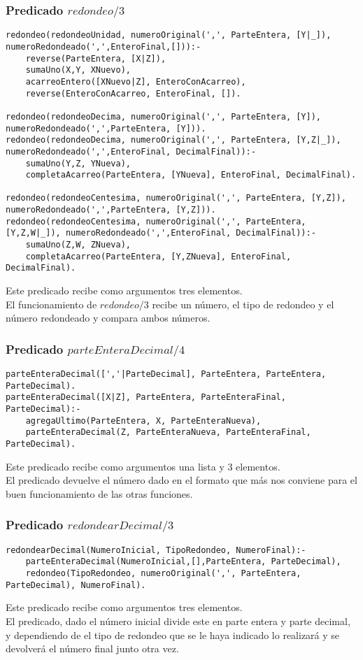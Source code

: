 \documentclass[11pt, a4paper]{article}
\begin{document}
\subsubsection{Predicado $redondeo/3$}
\begin{lstlisting}[frame=single]
redondeo(redondeoUnidad, numeroOriginal(',', ParteEntera, [Y|_]), numeroRedondeado(',',EnteroFinal,[])):-
    reverse(ParteEntera, [X|Z]),
    sumaUno(X,Y, XNuevo),
    acarreoEntero([XNuevo|Z], EnteroConAcarreo),
    reverse(EnteroConAcarreo, EnteroFinal, []).

redondeo(redondeoDecima, numeroOriginal(',', ParteEntera, [Y]), numeroRedondeado(',',ParteEntera, [Y])).
redondeo(redondeoDecima, numeroOriginal(',', ParteEntera, [Y,Z|_]), numeroRedondeado(',',EnteroFinal, DecimalFinal)):-
    sumaUno(Y,Z, YNueva),
    completaAcarreo(ParteEntera, [YNueva], EnteroFinal, DecimalFinal).

redondeo(redondeoCentesima, numeroOriginal(',', ParteEntera, [Y,Z]), numeroRedondeado(',',ParteEntera, [Y,Z])).
redondeo(redondeoCentesima, numeroOriginal(',', ParteEntera, [Y,Z,W|_]), numeroRedondeado(',',EnteroFinal, DecimalFinal)):-
    sumaUno(Z,W, ZNueva),
    completaAcarreo(ParteEntera, [Y,ZNueva], EnteroFinal, DecimalFinal).
\end{lstlisting}
Este predicado recibe como argumentos tres elementos.\\
El funcionamiento de $redondeo/3$ recibe un número, el tipo de redondeo y el número redondeado y compara ambos números.
\subsubsection{Predicado $parteEnteraDecimal/4$}
\begin{lstlisting}[frame=single]
parteEnteraDecimal([','|ParteDecimal], ParteEntera, ParteEntera, ParteDecimal).
parteEnteraDecimal([X|Z], ParteEntera, ParteEnteraFinal, ParteDecimal):-
    agregaUltimo(ParteEntera, X, ParteEnteraNueva),
    parteEnteraDecimal(Z, ParteEnteraNueva, ParteEnteraFinal, ParteDecimal).
\end{lstlisting}
Este predicado recibe como argumentos una lista y 3 elementos.\\
El predicado devuelve el número dado en el formato que más nos conviene para el buen funcionamiento de las otras funciones.
\subsubsection{Predicado $redondearDecimal/3$}
\begin{lstlisting}[frame=single]
redondearDecimal(NumeroInicial, TipoRedondeo, NumeroFinal):-
    parteEnteraDecimal(NumeroInicial,[],ParteEntera, ParteDecimal),
    redondeo(TipoRedondeo, numeroOriginal(',', ParteEntera, ParteDecimal), NumeroFinal).
\end{lstlisting}
Este predicado recibe como argumentos tres elementos.\\
El predicado, dado el número inicial divide este en parte entera y parte decimal, y dependiendo de el tipo de redondeo que se le haya indicado lo realizará y se devolverá el número final junto otra vez.
\end{document}
